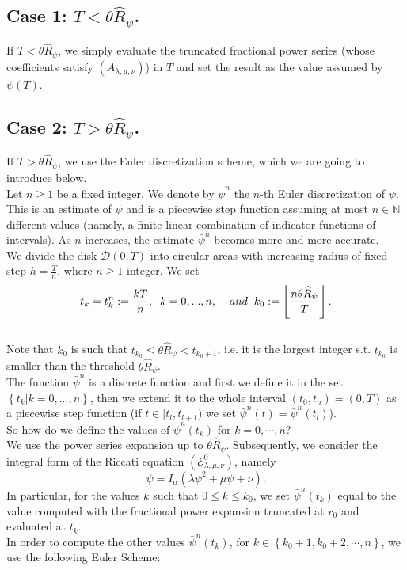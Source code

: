 \documentclass[a4paper,italian,11pt]{book}
\theoremstyle{plain}
\theoremstyle{remark}
\theoremstyle{plain}
\begin{document}
\subsection{Case 1: $T< \theta \widehat{R}_\psi$.}
If $T< \theta \widehat{R}_\psi$,
we simply evaluate the truncated fractional power series (whose coefficients satisfy $(A_{\lambda, \mu, \nu} )$) in $T$ and set the result as the value assumed by $\psi(T)$.

\subsection{Case 2: $T >  \theta \widehat{R}_\psi$.}
If $T >  \theta \widehat{R}_\psi$,
we use the Euler discretization scheme, which we are going to introduce below.
\\ 
Let $n\ge1 $ be a fixed integer. We denote by $\bar{\psi}^n$ the $n$-th Euler discretization of $\psi$. This is an estimate of $\psi$ and is a piecewise step function assuming at most $n\in \mathbb{N}$ different values (namely, a finite linear combination of indicator functions of intervals). As $n$ increases, the estimate $\bar{\psi}^n$ becomes more and more accurate.\\

We divide the disk $\mathcal{D}(0,T)$ into circular areas with increasing radius of fixed step $h=\frac{T}{n}$, where $n\ge 1$ integer. 
We set  
\begin{equation}\label{eq: tk and k0}
     t_k = t_k^n := \frac{kT}{n}, \hspace{0.2cm} k=0,...,n, \hspace{0.4cm} and \hspace{0.2cm} k_0 := \left\lfloor \frac{n \theta \widehat{R}_\psi }{T}\right\rfloor.
\end{equation}
\\
Note that $k_0$ is such that $t_{k_0} \le \theta \widehat{R}_\psi <t_{k_0 +1}$, i.e. it is the largest integer s.t. $t_{k_0}$ is smaller than the threshold $\theta \widehat{R}_\psi$.  \\
The function $\bar{\psi}^n$ is a discrete function and first we define it in the set $\left\{t_k| k=0,...,n \right\}$, then we extend it to the whole interval $(t_0,t_n) = (0,T)$ as a piecewise step function (if $t\in [t_l,t_{l+1})$ we set $\bar{\psi}^n(t) = \bar{\psi}^n(t_l)$). \\

So how do we define the values of $\bar{\psi}^n(t_k)$ for $k=0,\cdots,n$?
\\
We use the power series expansion up to $  \theta \widehat{R}_\psi$. Subsequently, we consider the integral form of the Riccati  equation $(\mathcal{E} ^0_{\lambda, \mu, \nu})$, namely
$$ \psi = I_\alpha \left( \lambda \psi^2 + \mu \psi + \nu \right).$$
In particular, for the values $k$ such that $0 \le k\le k_0$, we set $\bar{\psi}^n(t_k)$ equal to the value computed with the fractional power expansion truncated at $r_0$ and evaluated at $t_k$.
\\
In order to compute the other values $\bar{\psi}^n (t_k)$, for $k \in \left\{ k_0+1, k_0+2, \cdots, n \right\}$, we use the following Euler Scheme:
\end{document}
